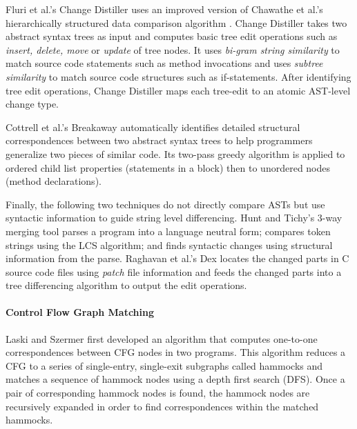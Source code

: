 \documentclass[runningheads,a4paper]{llncs}
\begin{document}
Fluri et al.'s Change Distiller \cite{Fluri2007} uses an improved version of Chawathe et al.'s hierarchically structured data comparison algorithm \cite{Chawathe1996}. Change Distiller takes two abstract syntax trees as input and computes basic tree edit operations such as {\it insert, delete, move} or {\it update} of tree nodes. It uses {\it bi-gram string similarity} to match source code statements such as method invocations and uses {\it subtree similarity} to match source code structures such as if-statements. After identifying tree edit operations, Change Distiller maps each tree-edit to an atomic AST-level change type. 

Cottrell et al.'s Breakaway \cite{Cottrell2007} automatically identifies detailed structural correspondences between two abstract syntax trees to help programmers generalize two pieces of similar code. Its two-pass greedy algorithm is applied to ordered child list properties (statements in a block) then to unordered nodes (method declarations). 

Finally, the following two techniques do not directly compare ASTs but use syntactic information to guide string level differencing. 
Hunt and Tichy's 3-way merging tool \cite{Hunt2002} parses a program into a language neutral form; compares token strings using the LCS algorithm; and finds syntactic changes using structural information from the parse.
Raghavan et al.'s Dex \cite{Raghavan2004} locates the changed parts in C source code files using {\it patch} file information and feeds the changed parts into a tree differencing algorithm to output the edit operations. 


\paragraph{Control Flow Graph Matching}
Laski and Szermer \cite{Laski1992} first developed an algorithm that computes one-to-one correspondences between CFG nodes in two programs. This algorithm reduces a CFG to a series of single-entry, single-exit subgraphs called hammocks and matches a sequence of hammock nodes using a depth first search (DFS). Once a pair of corresponding hammock nodes is found, the hammock nodes are recursively expanded in order to find correspondences within the matched hammocks. 
 
\end{document}
